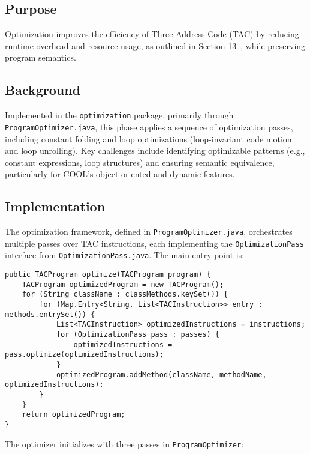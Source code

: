 \documentclass[11pt, titlepage]{article}
\begin{document}
\subsection{Purpose}
Optimization improves the efficiency of Three-Address Code (TAC) by reducing runtime overhead and resource usage, as outlined in Section 13~\cite{cool_manual}, while preserving program semantics.

\subsection{Background}
Implemented in the \texttt{optimization} package, primarily through \texttt{ProgramOptimizer.java}, this phase applies a sequence of optimization passes, including constant folding and loop optimizations (loop-invariant code motion and loop unrolling). Key challenges include identifying optimizable patterns (e.g., constant expressions, loop structures) and ensuring semantic equivalence, particularly for COOL's object-oriented and dynamic features.

\subsection{Implementation}
The optimization framework, defined in \texttt{ProgramOptimizer.java}, orchestrates multiple passes over TAC instructions, each implementing the \texttt{OptimizationPass} interface from \texttt{OptimizationPass.java}. The main entry point is:

\begin{lstlisting}
public TACProgram optimize(TACProgram program) {
    TACProgram optimizedProgram = new TACProgram();
    for (String className : classMethods.keySet()) {
        for (Map.Entry<String, List<TACInstruction>> entry : methods.entrySet()) {
            List<TACInstruction> optimizedInstructions = instructions;
            for (OptimizationPass pass : passes) {
                optimizedInstructions = pass.optimize(optimizedInstructions);
            }
            optimizedProgram.addMethod(className, methodName, optimizedInstructions);
        }
    }
    return optimizedProgram;
}
\end{lstlisting}

The optimizer initializes with three passes in \texttt{ProgramOptimizer}:
\end{document}
